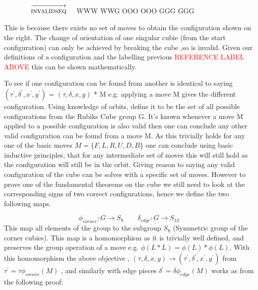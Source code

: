 \documentclass{article}
\begin{document}
\newcommand{\invalidseq}{[invalidseq],F2,F2}%
\newcommand{\invalidseqarrow}{$\quad\overrightarrow{\strut\textsc{invalidseq}}\quad$}

\begin{figure}
\centering
  \RubikCubeSolved%
  \invalidseqarrow
  \RubikRotation{\invalidseq}
   {W}{W}{W} {W}{W}{G}%
   {O}{O}{O} {O}{O}{O}%
   {G}{G}{G} {G}{G}{G}%
\end{figure}
\vspace{20pt}
This is because there exists no set of moves to obtain the configuration shown on the right. The change of orientation of one singular cubie (from the start configuration) can only be achieved by breaking the cube ,so is invalid. Given our definitions of a configuration and the labelling previous \textcolor{red}{REFERENCE LABEL ABOVE} this can be shown mathematically. 


To see if one configuration can be found from another is identical to saying $(\tau^{'} ,\delta^{'} , x^{'} , y^{'} )$ = $(\tau,\delta, x, y)$ * M e.g. applying a move M gives the different configuration. Using knowledge of orbits, define it to be the set of all possible configurations from the Rubiks Cube group G. It's known whenever a move M applied to a possible configuration is also valid then one can conclude any other valid configuration can be found from a move M. As this trivially holds for any one of the basic moves $M= \{{F,L,R,U,D,B}\}$ one can conclude using basic inductive principles, that for any intermediate set of moves this will still hold as the configuration will still be in the orbit. Giving reason to saying any valid configuration of the cube can be solves with a specific set of moves. However to prove one of the fundamental theorems on the cube we still need to look at the corresponding signs of two correct configurations, hence we define the two following maps. 


\begin{equation}\label{onto}
\phi_{corner}: G \rightarrow S_{8}\quad \quad 
\delta_{edge}: G \rightarrow S_{12}
\end{equation}
This map all elements of the group to the subgroup $S_{8}$ (Symmetric group of the corner cubies). This map is a homomorphism as it is trivially well defined, and preserves the group operation of a move e.g. $\phi (L*L) = \phi (L) * \phi(L)$. With this homomorphism the above objective , $(\tau,\delta, x, y) \longrightarrow (\tau^{'},\delta^{'}, x^{'}, y^{'})$ from $\tau^{'} = \tau\phi_{corner}(M) $ , and similarly with edge pieces $\delta^{'} = \delta\phi_{edge}(M) $ works as from the following proof:
\end{document}
